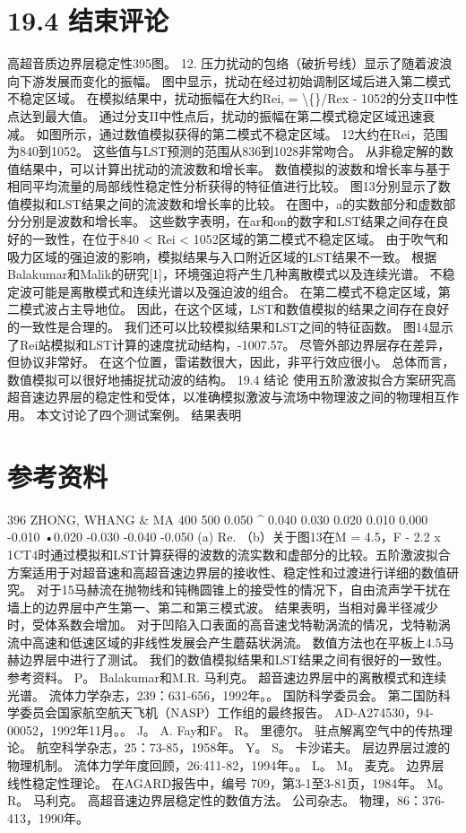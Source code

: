 \documentclass[UTF8,11pt,a4paper,openany,fontset=fandol]{ctexbook}
\begin{document}
\section{19.4 结束评论}
高超音质边界层稳定性395图。 12. 压力扰动的包络（破折号线）显示了随着波浪向下游发展而变化的振幅。 图中显示，扰动在经过初始调制区域后进入第二模式不稳定区域。 在模拟结果中，扰动振幅在大约Rei, = \textbackslash\{\}/Rex - 1052的分支II中性点达到最大值。 通过分支II中性点后，扰动的振幅在第二模式稳定区域迅速衰减。 如图所示，通过数值模拟获得的第二模式不稳定区域。 12大约在Rei，范围为840到1052。 这些值与LST预测的范围从836到1028非常吻合。 从非稳定解的数值结果中，可以计算出扰动的流波数和增长率。 数值模拟的波数和增长率与基于相同平均流量的局部线性稳定性分析获得的特征值进行比较。 图13分别显示了数值模拟和LST结果之间的流波数和增长率的比较。 在图中，a的实数部分和虚数部分分别是波数和增长率。 这些数字表明，在ar和on的数字和LST结果之间存在良好的一致性，在位于840 < Rei < 1052区域的第二模式不稳定区域。 由于吹气和吸力区域的强迫波的影响，模拟结果与入口附近区域的LST结果不一致。 根据Balakumar和Malik的研究[1]，环境强迫将产生几种离散模式以及连续光谱。 不稳定波可能是离散模式和连续光谱以及强迫波的组合。 在第二模式不稳定区域，第二模式波占主导地位。 因此，在这个区域，LST和数值模拟的结果之间存在良好的一致性是合理的。 我们还可以比较模拟结果和LST之间的特征函数。 图14显示了Rei站模拟和LST计算的速度扰动结构，-1007.57。 尽管外部边界层存在差异，但协议非常好。 在这个位置，雷诺数很大，因此，非平行效应很小。 总体而言，数值模拟可以很好地捕捉扰动波的结构。 19.4 结论 使用五阶激波拟合方案研究高超音速边界层的稳定性和受体，以准确模拟激波与流场中物理波之间的物理相互作用。 本文讨论了四个测试案例。 结果表明

\section{参考资料}
396 ZHONG, WHANG \& MA 400 500 0.050 \textasciicircum{} 0.040 0.030 0.020 0.010 0.000 -0.010 •0.020 -0.030 -0.040 -0.050 (a) Re. （b）关于图13在M = 4.5，F - 2.2 x 1CT4时通过模拟和LST计算获得的波数的流实数和虚部分的比较。五阶激波拟合方案适用于对超音速和高超音速边界层的接收性、稳定性和过渡进行详细的数值研究。 对于15马赫流在抛物线和钝椭圆锥上的接受性的情况下，自由流声学干扰在墙上的边界层中产生第一、第二和第三模式波。 结果表明，当相对鼻半径减少时，受体系数会增加。 对于凹陷入口表面的高音速戈特勒涡流的情况，戈特勒涡流中高速和低速区域的非线性发展会产生蘑菇状涡流。 数值方法也在平板上4.5马赫边界层中进行了测试。 我们的数值模拟结果和LST结果之间有很好的一致性。 参考资料。 P。 Balakumar和M.R. 马利克。 超音速边界层中的离散模式和连续光谱。 流体力学杂志，239：631-656，1992年。。 国防科学委员会。 第二国防科学委员会国家航空航天飞机（NASP）工作组的最终报告。 AD-A274530，94-00052，1992年11月。。 J。 A. Fay和F。 R。 里德尔。 驻点解离空气中的传热理论。 航空科学杂志，25：73-85，1958年。 Y。 S。 卡沙诺夫。 层边界层过渡的物理机制。 流体力学年度回顾，26:411-82，1994年。。 L。 M。 麦克。 边界层 线性稳定性理论。 在AGARD报告中，编号 709，第3-1至3-81页，1984年。 M。 R。 马利克。 高超音速边界层稳定性的数值方法。 公司杂志。 物理，86：376-413，1990年。
\end{document}
